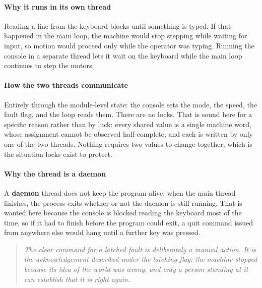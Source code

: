 \paragraph{Why it runs in its own thread}
Reading a line from the keyboard blocks until something is typed. If that happened in the main loop, the machine would stop stepping while waiting for input, so motion would proceed only while the operator was typing. Running the console in a separate thread lets it wait on the keyboard while the main loop continues to step the motors.


\paragraph{How the two threads communicate}
Entirely through the module-level state: the console sets the mode, the speed, the fault flag, and the loop reads them. There are no locks. That is sound here for a specific reason rather than by luck: every shared value is a single machine word, whose assignment cannot be observed half-complete, and each is written by only one of the two threads. Nothing requires two values to change together, which is the situation locks exist to protect.


\paragraph{Why the thread is a daemon}
A \textbf{daemon} thread does not keep the program alive: when the main thread finishes, the process exits whether or not the daemon is still running. That is wanted here because the console is blocked reading the keyboard most of the time, so if it had to finish before the program could exit, a quit command issued from anywhere else would hang until a further key was pressed.


\begin{quote}\small\itshape The clear command for a latched fault is deliberately a manual action. It is the acknowledgement described under the latching flag: the machine stopped because its idea of the world was wrong, and only a person standing at it can establish that it is right again.\end{quote}
